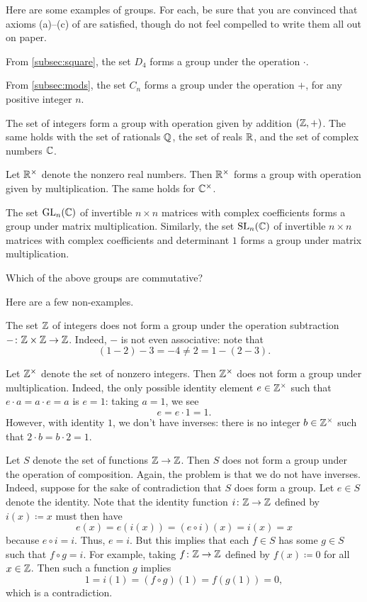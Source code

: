 \documentclass[../notes.tex]{subfiles}
\begin{document}
Here are some examples of groups. For each, be sure that you are convinced that axioms (a)--(c) of  are satisfied, though do not feel compelled to write them all out on paper.
\begin{example}
    From \cref{subsec:square}, the set $D_4$ forms a group under the operation $\cdot$.
\end{example}
\begin{example}
    From \cref{subsec:mods}, the set $C_n$ forms a group under the operation $+$, for any positive integer $n$.
\end{example}
\begin{example}
    The set of integers form a group with operation given by addition $(\mathbb Z, +)$. The same holds with the set of rationals $\mathbb Q$, the set of reals $\mathbb R$, and the set of complex numbers $\mathbb C$.
\end{example}
\begin{example}
    Let $\mathbb R^{\times}$ denote the nonzero real numbers. Then $\mathbb R^\times$ forms a group with operation given by multiplication. The same holds for $\mathbb C^\times$.
\end{example}
\begin{example}
    The set $\operatorname{GL}_n(\mathbb C)$ of invertible $n\times n$ matrices with complex coefficients forms a group under matrix multiplication. Similarly, the set $\operatorname{SL}_n(\mathbb C)$ of invertible $n\times n$ matrices with complex coefficients and determinant $1$ forms a group under matrix multiplication.
\end{example}
\begin{exe}
    Which of the above groups are commutative?
\end{exe}
Here are a few non-examples.
\begin{nex}
    The set $\mathbb Z$ of integers does not form a group under the operation subtraction $-\colon\mathbb Z\times\mathbb Z\to\mathbb Z$. Indeed, $-$ is not even associative: note that
    \[(1-2)-3=-4\ne2=1-(2-3).\]
\end{nex}
\begin{nex}
    Let $\mathbb Z^\times$ denote the set of nonzero integers. Then $\mathbb Z^\times$ does not form a group under multiplication. Indeed, the only possible identity element $e\in\mathbb Z^\times$ such that $e\cdot a=a\cdot e=a$ is $e=1$: taking $a=1$, we see
    \[e=e\cdot1=1.\]
    However, with identity $1$, we don't have inverses: there is no integer $b\in\mathbb Z^\times$ such that $2\cdot b=b\cdot 2=1$.
\end{nex}
\begin{nex}
    Let $S$ denote the set of functions $\mathbb Z\to\mathbb Z$. Then $S$ does not form a group under the operation of composition. Again, the problem is that we do not have inverses. Indeed, suppose for the sake of contradiction that $S$ does form a group. Let $e\in S$ denote the identity. Note that the identity function $i\colon\mathbb Z\to\mathbb Z$ defined by $i(x)\coloneqq x$ must then have
    \[e(x)=e(i(x))=(e\circ i)(x)=i(x)=x\]
    because $e\circ i=i$. Thus, $e=i$. But this implies that each $f\in S$ has some $g\in S$ such that $f\circ g=i$. For example, taking $f\colon\mathbb Z\to\mathbb Z$ defined by $f(x)\coloneqq0$ for all $x\in\mathbb Z$. Then such a function $g$ implies
    \[1=i(1)=(f\circ g)(1)=f(g(1))=0,\]
    which is a contradiction.
\end{nex}
\end{document}
